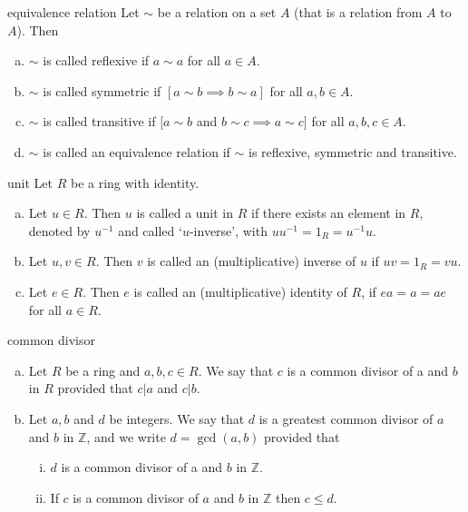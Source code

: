 \begin{defn}{equivalence relation}
	Let $\sim$ be a relation on a set $A$ (that is a relation from $A$ to $A$). Then
	\begin{enumerate}[(a)]
		\item $\sim$ is called reflexive if $a \sim a$ for all $a \in A$.
		\item $\sim$ is called symmetric if $[a \sim b \implies b \sim a]$ for all $a,b \in A$.
		\item $\sim$ is called transitive if $[a \sim b$ and $b \sim c \implies a \sim c]$ for all $a,b,c \in A$. 
		\item $\sim$ is called an equivalence relation if $\sim$ is reflexive, symmetric and transitive.
	\end{enumerate}
\end{defn}
\begin{defn}[Unit]{unit}
	Let $R$ be a ring with identity.
	\begin{enumerate}[(a)]
		\item Let $u \in R$. Then $u$ is called a unit in $R$ if there exists an element in $R$, denoted by $u^{-1}$ and called `$u$-inverse', with	$uu^{-1}=1_R=u^{-1}u$.
		\item Let $u, v \in R$. Then $v$ is called an (multiplicative) inverse of $u$ if $uv = 1_R = vu$.
		\item Let $e \in R$. Then $e$ is called an (multiplicative) identity of $R$, if $ea = a = ae$ for all $a \in R$.
	\end{enumerate}
\end{defn}
\begin{defn}{common divisor}
	\begin{enumerate}[(a)]
		\item Let $R$ be a ring and $a, b, c \in R$. We say that $c$ is a common divisor of a
		and $b$ in $R$ provided that $c|a$ and $c|b$.
		\item Let $a, b$ and $d$ be integers. We say that $d$ is a greatest common divisor of $a$ and $b$ in $\mathbb{Z}$, and
		we write $d=\gcd(a,b)$ provided that
		\begin{enumerate}[(i)]
		\item $d$ is a common divisor of a and $b$ in $\mathbb{Z}$.
		\item If $c$ is a common divisor of $a$ and $b$ in $\mathbb{Z}$ then $c \leq d$. 
		\end{enumerate}
	\end{enumerate}
\end{defn}
